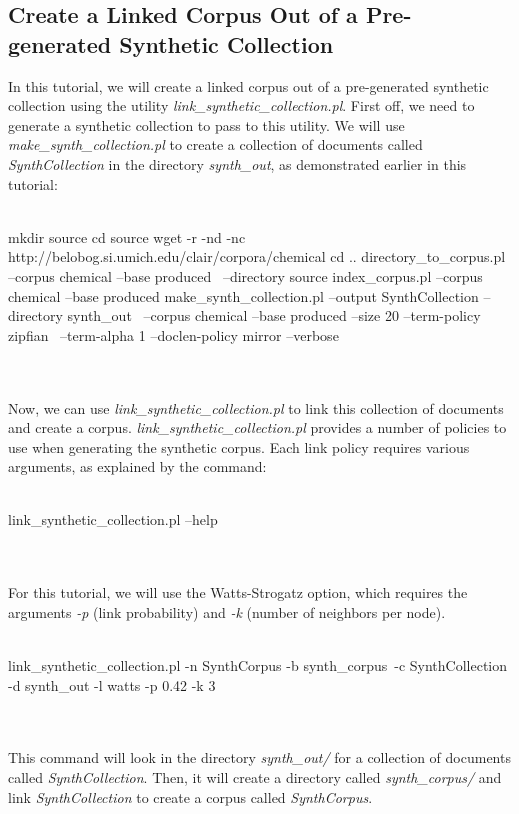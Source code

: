 \subsection{Create a Linked Corpus Out of a Pre-generated Synthetic Collection}

In this tutorial, we will create a linked corpus out of a pre-generated synthetic collection using the utility \emph{link\_synthetic\_collection.pl}. First off, we need to generate a synthetic collection to pass to this utility. We will use \emph{make\_synth\_collection.pl} to create a collection of documents called \emph{SynthCollection} in the directory \emph{synth\_out}, as demonstrated earlier in this tutorial:
\\
\\
\begin{boxedverbatim}
mkdir source
cd source
wget -r -nd -nc http://belobog.si.umich.edu/clair/corpora/chemical
cd ..
directory_to_corpus.pl --corpus chemical --base produced \
--directory source
index_corpus.pl --corpus chemical --base produced
make_synth_collection.pl --output SynthCollection --directory synth_out \
--corpus chemical --base produced --size 20 --term-policy zipfian \
--term-alpha 1 --doclen-policy mirror --verbose
\end{boxedverbatim}
\\
\\
Now, we can use \emph{link\_synthetic\_collection.pl} to link this collection of documents and create a corpus. \emph{link\_synthetic\_collection.pl} provides a number of policies to use when generating the synthetic corpus. Each link policy requires various arguments, as explained by the command:
\\
\\
\begin{boxedverbatim}
link_synthetic_collection.pl --help
\end{boxedverbatim}
\\
\\
For this tutorial, we will use the Watts-Strogatz option, which requires the arguments \emph{-p} (link probability) and \emph{-k} (number of neighbors per node).
\\
\\
\begin{boxedverbatim}
link_synthetic_collection.pl -n SynthCorpus -b synth_corpus\
 -c SynthCollection -d synth_out -l watts -p 0.42 -k 3
\end{boxedverbatim}
\\
\\
This command will look in the directory \emph{synth\_out/} for a collection of documents called \emph{SynthCollection}. Then, it will create a directory called \emph{synth\_corpus/} and link \emph{SynthCollection} to create a corpus called \emph{SynthCorpus}. 